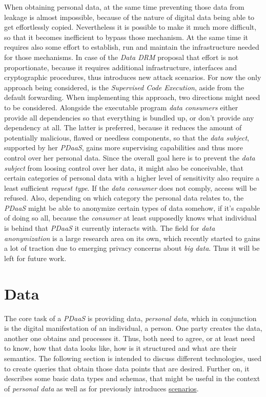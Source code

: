 \documentclass[12pt,english,a4paper,titlepage,cleardoublepage=empty,dottedtoc]{report}
\begin{document}
When obtaining personal data, at the same time preventing those data
from leakage is almost impossible, because of the nature of digital data
being able to get effortlessly copied. Nevertheless it is possible to
make it much more difficult, so that it becomes inefficient to bypass
those mechanism. At the same time it requires also some effort to
establish, run and maintain the infrastructure needed for those
mechanisms. In case of the \emph{Data DRM} proposal that effort is not
proportionate, because it requires additional infrastructure, interfaces
and cryptographic procedures, thus introduces new attack scenarios. For
now the only approach being considered, is the \emph{Supervised Code
Execution}, aside from the default forwarding. When implementing this
approach, two directions might need to be considered. Alongside the
executable program \emph{data consumers} either provide all dependencies
so that everything is bundled up, or don't provide any dependency at
all. The latter is preferred, because it reduces the amount of
potentially malicious, flawed or needless components, so that the
\emph{data subject}, supported by her \emph{PDaaS}, gains more
supervising capabilities and thus more control over her personal data.
Since the overall goal here is to prevent the \emph{data subject} from
loosing control over her data, it might also be conceivable, that
certain categories of personal data with a higher level of sensitivity
also require a least sufficient \emph{request type}. If the \emph{data
consumer} does not comply, access will be refused. Also, depending on
which category the personal data relates to, the \emph{PDaaS} might be
able to anonymize certain types of data somehow, if it's capable of
doing so all, because the \emph{consumer} at least supposedly knows what
individual is behind that \emph{PDaaS} it currently interacts with. The
field for \emph{data anonymization} is a large research area on its own,
which recently started to gains a lot of traction due to emerging
privacy concerns about \emph{big data}. Thus it will be left for future
work.

\hypertarget{data}{\section{Data}\label{data}}

The core task of a \emph{PDaaS} is providing data, \emph{personal data},
which in conjunction is the digital manifestation of an individual, a
person. One party creates the data, another one obtains and processes
it. Thus, both need to agree, or at least need to know, how that data
looks like, how is it structured and what are their semantics. The
following section is intended to discuss different technologies, used to
create queries that obtain those data points that are desired. Further
on, it describes some basic data types and schemas, that might be useful
in the context of \emph{personal data} as well as for previously
introduces \protect\hyperlink{scenarios}{scenarios}.
\end{document}
